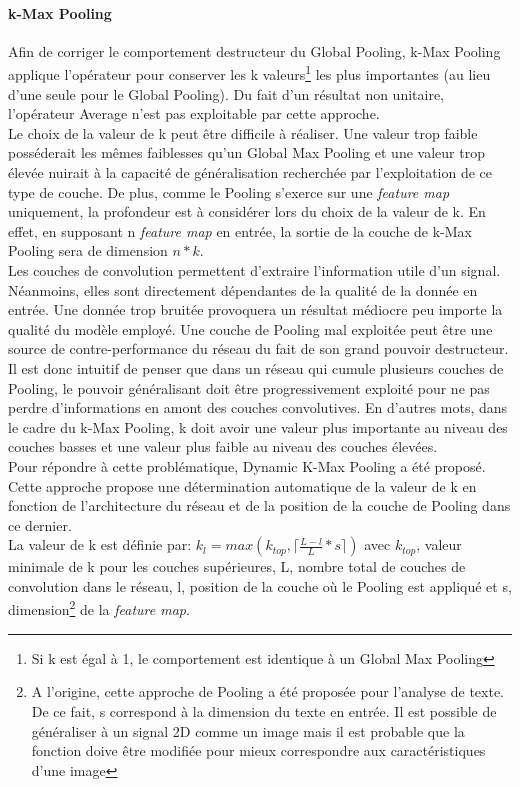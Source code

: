 \paragraph{k-Max Pooling}
Afin de corriger le comportement destructeur du Global Pooling, k-Max Pooling\cite{kmaxpool} applique l'opérateur pour conserver les k valeurs\footnote{Si k est égal à 1, le comportement est identique à un Global Max Pooling} les plus importantes (au lieu d'une seule pour le Global Pooling). Du fait d'un résultat non unitaire, l'opérateur Average n'est pas exploitable par cette approche.\\

\noindent Le choix de la valeur de k peut être difficile à réaliser. Une valeur trop faible posséderait les mêmes faiblesses qu'un Global Max Pooling et une valeur trop élevée nuirait à la capacité de généralisation recherchée par l'exploitation de ce type de couche. De plus, comme le Pooling s'exerce sur une \textit{feature map} uniquement, la profondeur est à considérer lors du choix de la valeur de k. En effet, en supposant n \textit{feature map} en entrée, la sortie de la couche de k-Max Pooling sera de dimension $n*k$.\\

\noindent Les couches de convolution permettent d'extraire l'information utile d'un signal. Néanmoins, elles sont directement dépendantes de la qualité de la donnée en entrée. Une donnée trop bruitée provoquera un résultat médiocre peu importe la qualité du modèle employé. Une couche de Pooling mal exploitée peut être une source de contre-performance du réseau du fait de son grand pouvoir destructeur. Il est donc intuitif de penser que dans un réseau qui cumule plusieurs couches de Pooling, le pouvoir généralisant doit être progressivement exploité pour ne pas perdre d'informations en amont des couches convolutives. En d'autres mots, dans le cadre du k-Max Pooling, k doit avoir une valeur plus importante au niveau des couches basses et une valeur plus faible au niveau des couches élevées.\\

\noindent Pour répondre à cette problématique, Dynamic K-Max Pooling \cite{kmaxpool} a été proposé. Cette approche propose une détermination automatique de la valeur de k en fonction de l'architecture du réseau et de la position de la couche de Pooling dans ce dernier.\\

\noindent La valeur de k est définie par: $k_l=max(k_{top},\lceil\frac{L-l}{L}*s\rceil)$ avec $k_{top}$, valeur minimale de k pour les couches supérieures, L, nombre total de couches de convolution dans le réseau, l, position de la couche où le Pooling est appliqué et s, dimension\footnote{A l'origine, cette approche de Pooling a été proposée pour l'analyse de texte. De ce fait, s correspond à la dimension du texte en entrée. Il est possible de généraliser à un signal 2D comme un image mais il est probable que la fonction doive être modifiée pour mieux correspondre aux caractéristiques d'une image} de la \textit{feature map}.\\

